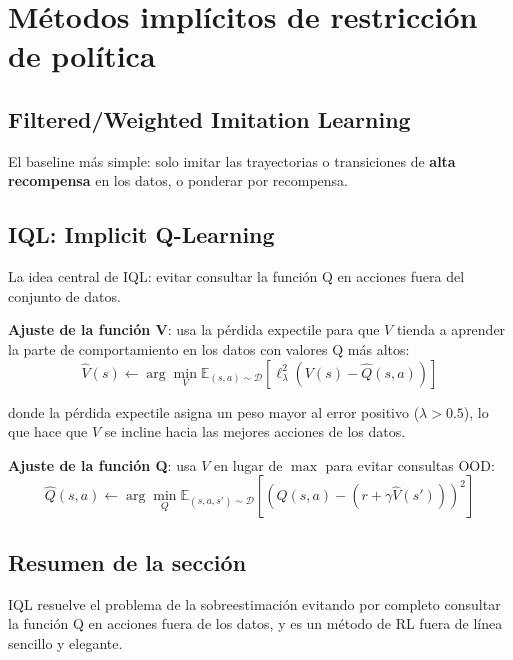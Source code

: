\section{Métodos implícitos de restricción de política}

\subsection{Filtered/Weighted Imitation Learning}

El baseline más simple: solo imitar las trayectorias o transiciones de \textbf{alta recompensa} en los datos, o ponderar por recompensa.

\subsection{IQL: Implicit Q-Learning}

La idea central de IQL: evitar consultar la función Q en acciones fuera del conjunto de datos.

\textbf{Ajuste de la función V}: usa la pérdida expectile para que $V$ tienda a aprender la parte de comportamiento en los datos con valores Q más altos:
$$\hat{V}(s) \leftarrow \arg\min_{V} \mathbb{E}_{(s,a) \sim \mathcal{D}} \left[\ell_\lambda^2\left(V(s) - \hat{Q}(s, a)\right)\right]$$

donde la pérdida expectile asigna un peso mayor al error positivo ($\lambda > 0.5$), lo que hace que $V$ se incline hacia las mejores acciones de los datos.

\textbf{Ajuste de la función Q}: usa $V$ en lugar de $\max$ para evitar consultas OOD:
$$\hat{Q}(s, a) \leftarrow \arg\min_{Q} \mathbb{E}_{(s,a,s') \sim \mathcal{D}} \left[\left(Q(s,a) - (r + \gamma \hat{V}(s'))\right)^2\right]$$

\subsection{Resumen de la sección}

IQL resuelve el problema de la sobreestimación evitando por completo consultar la función Q en acciones fuera de los datos, y es un método de RL fuera de línea sencillo y elegante.

